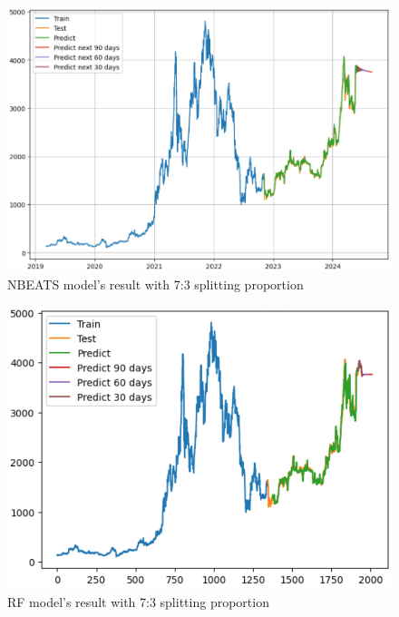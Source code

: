\documentclass{ieeeojies}
\begin{document}
\begin{figure}[H]
	\centering
	\begin{minipage}{0.6\linewidth}
		\centering
		\includegraphics[width=\linewidth]{bibliography/Images/NBEATS_ETH_73.PNG}
		\caption{NBEATS model's result with 7:3 splitting proportion}
	\end{minipage}
\end{figure}
\begin{figure}[H]
	\centering
	\begin{minipage}{0.6\linewidth}
		\centering
		\includegraphics[width=\linewidth]{bibliography/Images/RF_ETH_73.PNG}
		\caption{RF model's result with 7:3 splitting proportion}
	\end{minipage}
\end{figure}
\end{document}

